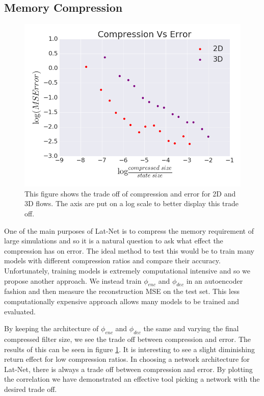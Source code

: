 \documentclass{article}
\begin{document}
\subsection{Memory Compression}

\begin{figure}
  \centering
  \includegraphics[scale=0.3]{../test/figs/compression_error_plot.png}
  \caption{This figure shows the trade off  of compression and error for 2D and 3D flows. The axis are put on a log scale to better display this trade off.}
  \label{compression_plot}
\end{figure}

One of the main purposes of Lat-Net is to compress the memory requirement of large simulations and so it is a natural question to ask what effect the compression has on error. The ideal method to test this would be to train many models with different compression ratios and compare their accuracy. Unfortunately, training models is extremely computational intensive and so we propose another approach. We instead train $\phi_{enc}$ and $\phi_{dec}$ in an autoencoder fashion and then measure the reconstruction MSE on the test set. This less computationally expensive approach allows many models to be trained and evaluated.

By keeping the architecture of $\phi_{enc}$ and $\phi_{dec}$ the same and varying the final compressed filter size, we see the trade off between compression and error. The results of this can be seen in figure \ref{compression_plot}. It is interesting to see a slight diminishing return effect for low compression ratios. In choosing a network architecture for Lat-Net, there is always a trade off between compression and error. By plotting the correlation we have demonstrated an effective tool picking a network with the desired trade off.
\end{document}
